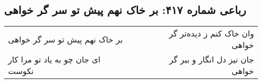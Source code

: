 \begin{center}
\section*{رباعی شماره ۴۱۷: بر خاک نهم پیش تو سر گر خواهی}
\label{sec:sh417}
\begin{longtable}{l p{0.5cm} r}
بر خاک نهم پیش تو سر گر خواهی
&&
وان خاک کنم ز دیده‌تر گر خواهی
\\
ای جان چو به یاد تو مرا کار نکوست
&&
جان نیز دل انگار و ببر گر خواهی
\\
\end{longtable}
\end{center}
